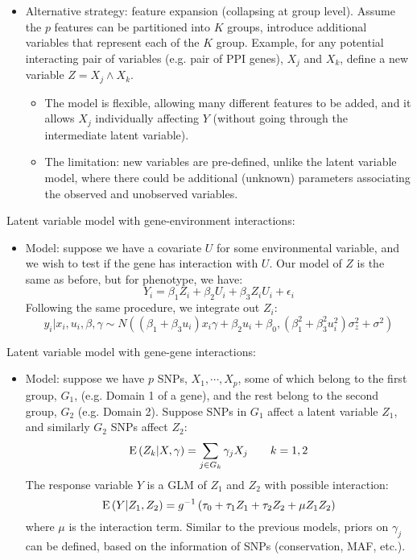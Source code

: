 \documentclass[11pt]{article}
\def\E{{\rm E}\,}
\begin{document}
\begin{enumerate}
\begin{itemize}
\item Alternative strategy: feature expansion (collapsing at group level). Assume the $p$ features can be partitioned into $K$ groups, introduce additional variables that represent each of the $K$ group. Example, for any potential interacting pair of variables (e.g. pair of PPI genes), $X_j$ and $X_k$, define a new variable $Z = X_j \wedge X_k$.
\begin{itemize}
	\item The model is flexible, allowing many different features to be added, and it allows $X_j$ individually affecting $Y$ (without going through the intermediate latent variable). 
	\item The limitation: new variables are pre-defined, unlike the latent variable model, where there could be additional (unknown) parameters associating the observed and unobserved variables.  
\end{itemize}
\end{itemize}

Latent variable model with gene-environment interactions: 
\begin{itemize}
\item Model: suppose we have a covariate $U$ for some environmental variable, and we wish to test if the gene has interaction with $U$. Our model of $Z$ is the same as before, but for phenotype, we have: 
\begin{equation}
Y_i = \beta_1 Z_i + \beta_2 U_i + \beta_3 Z_i U_i + \epsilon_i	
\end{equation}
Following the same procedure, we integrate out $Z_i$: 
\begin{equation}
y_i | x_i, u_i, \beta, \gamma \sim N\left( (\beta_1 + \beta_3 u_i) x_i \gamma + \beta_2 u_i + \beta_0, (\beta_1^2 + \beta_3^2 u_i^2)\sigma_z^2 + \sigma^2\right)	
\end{equation}

\end{itemize}

Latent variable model with gene-gene interactions: 
\begin{itemize}
\item Model: suppose we have $p$ SNPs, $X_1, \cdots, X_p$, some of which belong to the first group, $G_1$, (e.g. Domain 1 of a gene), and the rest belong to the second group, $G_2$ (e.g. Domain 2). Suppose SNPs in $G_1$ affect a latent variable $Z_1$, and similarly $G_2$ SNPs affect $Z_2$:
\begin{equation}
\E(Z_k|X,\gamma) = \sum_{j \in G_k} \gamma_j X_j \qquad k = 1, 2
\end{equation}
The response variable $Y$ is a GLM of $Z_1$ and $Z_2$ with possible interaction: 
\begin{equation}
\E(Y|Z_1, Z_2) = g^{-1}\left(\tau_0 + \tau_1 Z_1 + \tau_2 Z_2 + \mu Z_1 Z_2\right)
\end{equation}
where $\mu$ is the interaction term. Similar to the previous models, priors on $\gamma_j$ can be defined, based on the information of SNPs (conservation, MAF, etc.). 


\end{itemize}
\end{enumerate}
\end{document}
